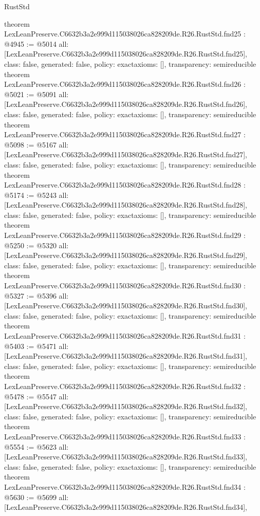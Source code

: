 \begin{lexlean}{RustStd}
\begin{coremodule}
{}
theorem LexLeanPreserve.C6632b3a2e999d115038026ca828209de.R26.RustStd.fnd25 : @4945 := @5014 {
  all: [LexLeanPreserve.C6632b3a2e999d115038026ca828209de.R26.RustStd.fnd25],
  class: false,
  generated: false,
  policy: exact{axioms: []},
  transparency: semireducible
}
theorem LexLeanPreserve.C6632b3a2e999d115038026ca828209de.R26.RustStd.fnd26 : @5021 := @5091 {
  all: [LexLeanPreserve.C6632b3a2e999d115038026ca828209de.R26.RustStd.fnd26],
  class: false,
  generated: false,
  policy: exact{axioms: []},
  transparency: semireducible
}
theorem LexLeanPreserve.C6632b3a2e999d115038026ca828209de.R26.RustStd.fnd27 : @5098 := @5167 {
  all: [LexLeanPreserve.C6632b3a2e999d115038026ca828209de.R26.RustStd.fnd27],
  class: false,
  generated: false,
  policy: exact{axioms: []},
  transparency: semireducible
}
theorem LexLeanPreserve.C6632b3a2e999d115038026ca828209de.R26.RustStd.fnd28 : @5174 := @5243 {
  all: [LexLeanPreserve.C6632b3a2e999d115038026ca828209de.R26.RustStd.fnd28],
  class: false,
  generated: false,
  policy: exact{axioms: []},
  transparency: semireducible
}
theorem LexLeanPreserve.C6632b3a2e999d115038026ca828209de.R26.RustStd.fnd29 : @5250 := @5320 {
  all: [LexLeanPreserve.C6632b3a2e999d115038026ca828209de.R26.RustStd.fnd29],
  class: false,
  generated: false,
  policy: exact{axioms: []},
  transparency: semireducible
}
theorem LexLeanPreserve.C6632b3a2e999d115038026ca828209de.R26.RustStd.fnd30 : @5327 := @5396 {
  all: [LexLeanPreserve.C6632b3a2e999d115038026ca828209de.R26.RustStd.fnd30],
  class: false,
  generated: false,
  policy: exact{axioms: []},
  transparency: semireducible
}
theorem LexLeanPreserve.C6632b3a2e999d115038026ca828209de.R26.RustStd.fnd31 : @5403 := @5471 {
  all: [LexLeanPreserve.C6632b3a2e999d115038026ca828209de.R26.RustStd.fnd31],
  class: false,
  generated: false,
  policy: exact{axioms: []},
  transparency: semireducible
}
theorem LexLeanPreserve.C6632b3a2e999d115038026ca828209de.R26.RustStd.fnd32 : @5478 := @5547 {
  all: [LexLeanPreserve.C6632b3a2e999d115038026ca828209de.R26.RustStd.fnd32],
  class: false,
  generated: false,
  policy: exact{axioms: []},
  transparency: semireducible
}
theorem LexLeanPreserve.C6632b3a2e999d115038026ca828209de.R26.RustStd.fnd33 : @5554 := @5623 {
  all: [LexLeanPreserve.C6632b3a2e999d115038026ca828209de.R26.RustStd.fnd33],
  class: false,
  generated: false,
  policy: exact{axioms: []},
  transparency: semireducible
}
theorem LexLeanPreserve.C6632b3a2e999d115038026ca828209de.R26.RustStd.fnd34 : @5630 := @5699 {
  all: [LexLeanPreserve.C6632b3a2e999d115038026ca828209de.R26.RustStd.fnd34],
}
\end{coremodule}
\end{lexlean}
